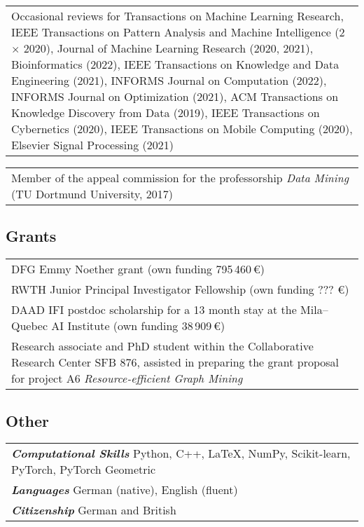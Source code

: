 \documentclass[11pt, a4paper, DIV=12]{scrartcl}
\begin{document}
\begin{tabular}{p{14.5cm}}
Occasional reviews for Transactions on Machine Learning Research, IEEE Transactions on Pattern Analysis and Machine Intelligence (2$\times$ 2020), Journal of Machine Learning Research (2020, 2021), Bioinformatics (2022), IEEE Transactions on Knowledge and Data Engineering (2021), INFORMS Journal on Computation (2022), INFORMS Journal on Optimization (2021), ACM Transactions on Knowledge Discovery from Data (2019), IEEE Transactions on Cybernetics (2020), IEEE Transactions on Mobile Computing (2020), Elsevier Signal Processing (2021)\\[0.5em]
\end{tabular}

\begin{tabular}{p{14.5cm}}
Member of the appeal commission for the professorship \emph{Data Mining} (TU Dortmund University, 2017)
\end{tabular}

\subsection*{Grants}
\begin{tabular}{p{14.5cm}}
	DFG Emmy Noether grant (own funding 795\,460\,€)\\[0.5em]
	
	RWTH Junior Principal Investigator Fellowship (own funding ??? €)\\[0.5em]

	DAAD IFI postdoc scholarship for a 13 month stay at the Mila--Quebec AI Institute (own funding 38\,909\,€)\\[0.5em]
		
	Research associate and PhD student  within the Collaborative Research Center SFB 876, assisted in preparing the  grant proposal for project A6 \emph{Resource-efficient Graph Mining}
\end{tabular}


\subsection*{Other}

\begin{tabular}{l}
	\textsf{\textbf{\em Computational Skills}} Python, C\hspace{-1pt}+\hspace{-1pt}+, \LaTeX, NumPy, Scikit-learn, PyTorch, PyTorch Geometric\\
	\textsf{\textbf{\em Languages}} German (native), English (fluent)\\
	\textsf{\textbf{\em Citizenship}} German and British
\end{tabular}
\end{document}
